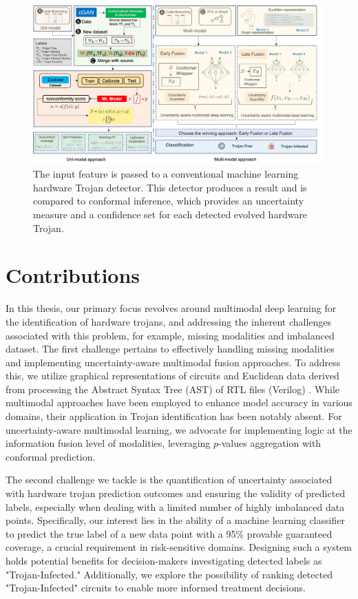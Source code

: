 \begin{figure}
  \centering
   \includegraphics[width=1\linewidth]{figs/solution_thesis.png}
   \caption{The input feature is passed to a conventional machine learning hardware Trojan detector. This detector produces a result and is compared to conformal inference, which provides an uncertainty measure and a confidence set for each detected evolved hardware Trojan.}
  \label{fig:introduction}
\end{figure}


\section*{Contributions}
\label{Contribution}
In this thesis, our primary focus revolves around multimodal deep learning for the identification of hardware trojans, and addressing the inherent challenges associated with this problem, for example, missing modalities and imbalanced dataset. The first challenge pertains to effectively handling missing modalities and implementing uncertainty-aware multimodal fusion approaches. To address this, we utilize graphical representations of circuits \cite{yu2021hw2vec} and Euclidean data derived from processing the Abstract Syntax Tree (AST) of RTL files (Verilog) \cite{px6s-sm21-22}. While multimodal approaches have been employed to enhance model accuracy in various domains, their application in Trojan identification has been notably absent. For uncertainty-aware multimodal learning, we advocate for implementing logic at the information fusion level of modalities, leveraging $p$-values aggregation with conformal prediction.

The second challenge we tackle is the quantification of uncertainty associated with hardware trojan prediction outcomes and ensuring the validity of predicted labels, especially when dealing with a limited number of highly imbalanced data points. Specifically, our interest lies in the ability of a machine learning classifier to predict the true label of a new data point with a 95\% provable guaranteed coverage, a crucial requirement in risk-sensitive domains. Designing such a system holds potential benefits for decision-makers investigating detected labels as "Trojan-Infected." Additionally, we explore the possibility of ranking detected "Trojan-Infected" circuits to enable more informed treatment decisions.


